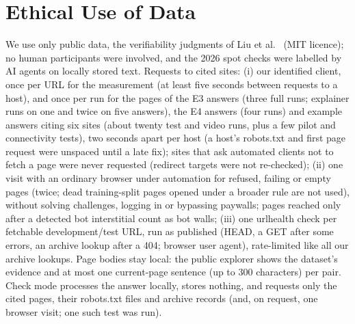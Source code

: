 \section{Ethical Use of Data}
\label{sec:ethics}
We use only public data, the verifiability judgments of Liu et al.~\cite{Liu_2023} (MIT licence); no human participants were involved, and the 2026 spot checks were labelled by AI agents on locally stored text. Requests to cited sites: (i) our identified client, once per URL for the measurement (at least five seconds between requests to a host), and once per run for the pages of the \eThreeN E3 answers (three full runs; explainer runs on one and twice on five answers), the \eFourN E4 answers (four runs) and example answers citing six sites (about twenty test and video runs, plus a few pilot and connectivity tests), two seconds apart per host (a host's robots.txt and first page request were unspaced until a late fix); sites that ask automated clients not to fetch a page were never requested (redirect targets were not re-checked); (ii) one visit with an ordinary browser under automation for \browserN refused, failing or empty pages (\browserTwice twice; \browserUnused dead training-split pages opened under a broader rule are not used), without solving challenges, logging in or bypassing paywalls; pages reached only after a detected bot interstitial count as bot walls; (iii) one urlhealth check per fetchable development/test URL, run as published (HEAD, a GET after some errors, an archive lookup after a 404; browser user agent), rate-limited like all our archive lookups. Page bodies stay local: the public explorer shows the dataset's evidence and at most one current-page sentence (up to 300 characters) per pair. Check mode processes the answer locally, stores nothing, and requests only the cited pages, their robots.txt files and archive records (and, on request, one browser visit; one such test was run).
